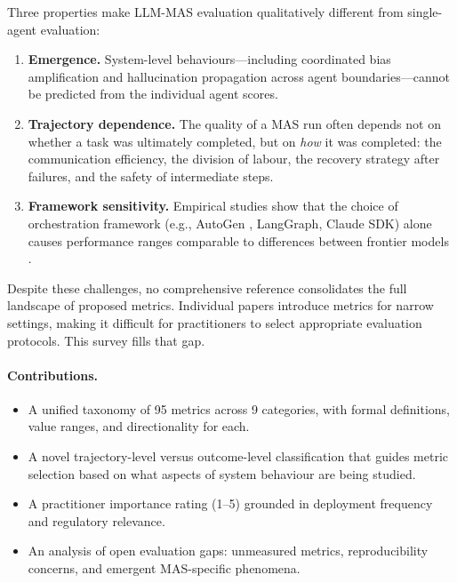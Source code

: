 \documentclass[11pt,a4paper]{article}
\begin{document}
Three properties make LLM-MAS evaluation qualitatively different from single-agent
evaluation:

\begin{enumerate}[leftmargin=*, label=\textbf{\arabic*.}]
  \item \textbf{Emergence.} System-level behaviours—including coordinated bias
    amplification \citep{emergent_bias2024} and hallucination propagation across agent
    boundaries—cannot be predicted from the individual agent scores.
  \item \textbf{Trajectory dependence.} The quality of a MAS run often depends not on
    whether a task was ultimately completed, but on \emph{how} it was completed: the
    communication efficiency, the division of labour, the recovery strategy after
    failures, and the safety of intermediate steps.
  \item \textbf{Framework sensitivity.} Empirical studies show that the choice of
    orchestration framework (e.g., AutoGen \citep{autogen2023}, LangGraph, Claude SDK)
    alone causes performance ranges comparable to differences between frontier
    models \citep{maseval2025}.
\end{enumerate}

Despite these challenges, no comprehensive reference consolidates the full landscape
of proposed metrics. Individual papers introduce metrics for narrow settings, making it
difficult for practitioners to select appropriate evaluation protocols. This survey fills
that gap.

\paragraph{Contributions.}
\begin{itemize}
  \item A unified taxonomy of 95 metrics across 9 categories, with formal definitions,
    value ranges, and directionality for each.
  \item A novel trajectory-level versus outcome-level classification that guides metric
    selection based on what aspects of system behaviour are being studied.
  \item A practitioner importance rating (1--5) grounded in deployment frequency and
    regulatory relevance.
  \item An analysis of open evaluation gaps: unmeasured metrics, reproducibility
    concerns, and emergent MAS-specific phenomena.
\end{itemize}
\end{document}
